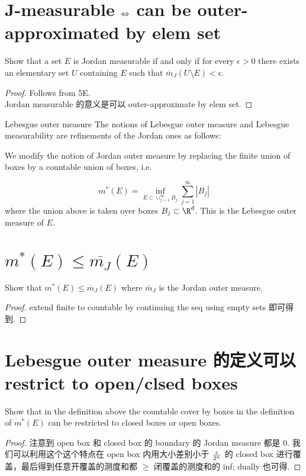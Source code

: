 \documentclass[lang=cn,11pt]{template}
\begin{document}
\section{J-measurable $\Leftrightarrow$ can be outer-approximated by elem set}
Show that a set $E$ is Jordan measurable if and only if for every $\epsilon>0$ there exists an elementary set $U$ containing $E$ such that $\overline{m}_J(U\setminus E)<\epsilon$.
\begin{proof}
    Follows from 5E.\\
    Jordan measurable 的意义是可以 outer-approximate by elem set.
\end{proof}

\begin{definition}{Lebesgue outer measure}
The notions of Lebesgue outer measure and Lebesgue measurability are refinements of the Jordan ones as follows:

 We modify the notion of Jordan outer measure by replacing the finite union of boxes by a countable union of boxes, i.e.

$$
m^*(E)=\inf_{E\subset \cup_{j=1}^\infty B_j} \sum_{j=1}^\infty |B_j|
$$
where the union above is taken over boxes $B_j \subset \R^d$. This is the Lebesgue outer measure of $E$. 

\end{definition}


\section{$m^*(E) \leq \overline{m_J} (E)$}
Show that $m^*(E)\leq \overline{m}_J(E)$ where $\bar m_J$ is the Jordan outer measure. 

\begin{proof}
    extend finite to countable by continuing the seq using empty sets 即可得到.
\end{proof}


\section{Lebesgue outer measure 的定义可以 restrict to open/clsed boxes}
 Show that in the definition above the countable cover by boxes in the definition of $m^*(E)$ can be restricted to closed boxes or open boxes.
\begin{proof}
    注意到 open box 和 closed box 的 boundary 的 Jordan measure 都是 0. 我们可以利用这个这个特点在 open box 内用大小差别小于 $\epsilon \over {2^n}$ 的 closed box 进行覆盖，最后得到任意开覆盖的测度和都 $\geq$ 闭覆盖的测度和的 inf; dually 也可得. 
\end{proof}
\end{document}
